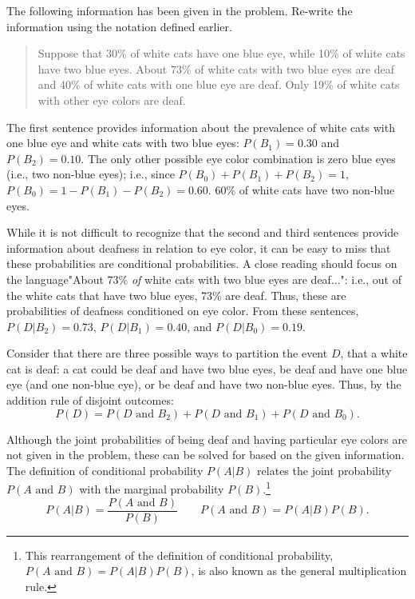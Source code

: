 \begin{examplewrap}
\begin{nexample}{The following information has been given in the problem. Re-write the information using the notation defined earlier.
	\begin{quote}
		Suppose that 30\% of white cats have one blue eye, while 10\% of white cats have two blue eyes. About 73\% of white cats with two blue eyes are deaf and 40\% of white cats with one blue eye are deaf. Only 19\% of white cats with other eye colors are deaf.
	\end{quote}}

The first sentence provides information about the prevalence of white cats with one blue eye and white cats with two blue eyes: $P(B_1) = 0.30$ and $P(B_2) = 0.10$. The only other possible eye color combination is zero blue eyes (i.e., two non-blue eyes); i.e., since $P(B_0) + P(B_1) + P(B_2) = 1$, $P(B_0) = 1  - P(B_1) - P(B_2) = 0.60$. 60\% of white cats have two non-blue eyes.

While it is not difficult to recognize that the second and third sentences provide information about deafness in relation to eye color, it can be easy to miss that these probabilities are conditional probabilities. A close reading should focus on the language\textemdash "About 73\% \textit{of} white cats with two blue eyes are deaf...": i.e., out of the white cats that have two blue eyes, 73\% are deaf. Thus, these are probabilities of deafness conditioned on eye color. From these sentences, $P(D|B_2) = 0.73$, $P(D|B_1) = 0.40$, and $P(D|B_0) = 0.19$. 
\end{nexample}
\end{examplewrap}

Consider that there are three possible ways to partition the event $D$, that a white cat is deaf: a cat could be deaf and have two blue eyes, be deaf and have one blue eye (and one non-blue eye), or be deaf and have two non-blue eyes. Thus, by the addition rule of disjoint outcomes: 
\[P(D) = P(D \textrm{ and } B_2 ) + P(D \textrm{ and } B_1 ) + P(D \textrm{ and } B_0 ).\]

Although the joint probabilities of being deaf and having particular eye colors are not given in the problem, these can be solved for based on the given information. The definition of conditional probability $P(A|B)$ relates the joint probability $P(A \textrm{ and } B)$ with the marginal probability $P(B)$.\footnote{This rearrangement of the definition of conditional probability, $P(A \textrm{ and } B) = P(A|B)P(B)$, is also known as the general multiplication rule.}  
\[P(A|B) = \dfrac{P(A \textrm{ and } B)}{P(B)} \qquad P(A \textrm{ and } B) = P(A|B)P(B). \]

